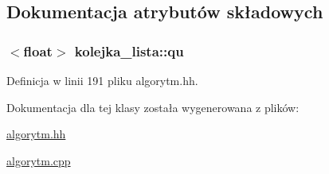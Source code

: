\subsection{\-Dokumentacja atrybutów składowych}
\hypertarget{classkolejka__lista_a5e378458ccfc86d903b1a71a8ff5bad8}{
\subsubsection[{qu}]{$<$float$>$ {\bf kolejka\-\_\-lista\-::qu}}}\label{classkolejka__lista_a5e378458ccfc86d903b1a71a8ff5bad8}


\-Definicja w linii 191 pliku algorytm.\-hh.



\-Dokumentacja dla tej klasy została wygenerowana z plików\-:\begin{DoxyCompactItemize}
\item 
\hyperlink{algorytm_8hh}{algorytm.\-hh}\item 
\hyperlink{algorytm_8cpp}{algorytm.\-cpp}\end{DoxyCompactItemize}
